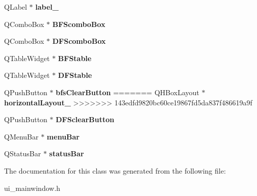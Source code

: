 \begin{DoxyCompactItemize}
Q\+Label $\ast$ {\bfseries label\+\_}
\item 
\mbox{\label{class_ui___main_window_ae4f6eb4c5b87c3f967b47d095d77d886}} 
Q\+Combo\+Box $\ast$ {\bfseries B\+F\+Scombo\+Box}
\item 
\mbox{\label{class_ui___main_window_a98941b1be95cfda7e0245a8a1e084001}} 
Q\+Combo\+Box $\ast$ {\bfseries D\+F\+Scombo\+Box}
\item 
\mbox{\label{class_ui___main_window_a25bfeb989e7757783b83516b94fc9003}} 
Q\+Table\+Widget $\ast$ {\bfseries B\+F\+Stable}
\item 
\mbox{\label{class_ui___main_window_ab712a9480a2f4ca6ae27685f45240876}} 
Q\+Table\+Widget $\ast$ {\bfseries D\+F\+Stable}
\item 
\mbox{\label{class_ui___main_window_af43458cacc6e5713303cd8be5b413dd7}} 
Q\+Push\+Button $\ast$ {\bfseries bfs\+Clear\+Button}
=======
\mbox{\label{class_ui___main_window_a80867018070156432923d0266cc9fe25}} 
Q\+H\+Box\+Layout $\ast$ {\bfseries horizontal\+Layout\+\_}
>>>>>>> 143edfd9820bc60ce19867fd5da837f486619a9f
\item 
\mbox{\label{class_ui___main_window_aa1e84cc66484fb63f294b468ceac5af6}} 
Q\+Push\+Button $\ast$ {\bfseries D\+F\+Sclear\+Button}
\item 
\mbox{\label{class_ui___main_window_a2be1c24ec9adfca18e1dcc951931457f}} 
Q\+Menu\+Bar $\ast$ {\bfseries menu\+Bar}
\item 
\mbox{\label{class_ui___main_window_a50fa481337604bcc8bf68de18ab16ecd}} 
Q\+Status\+Bar $\ast$ {\bfseries status\+Bar}
\end{DoxyCompactItemize}


The documentation for this class was generated from the following file\+:\begin{DoxyCompactItemize}
\item 
ui\+\_\+mainwindow.\+h\end{DoxyCompactItemize}

